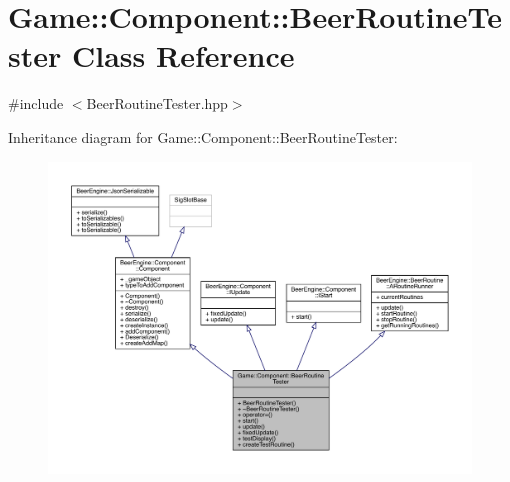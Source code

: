 \hypertarget{class_game_1_1_component_1_1_beer_routine_tester}{}\section{Game\+:\+:Component\+:\+:Beer\+Routine\+Tester Class Reference}
\label{class_game_1_1_component_1_1_beer_routine_tester}


{\ttfamily \#include $<$Beer\+Routine\+Tester.\+hpp$>$}



Inheritance diagram for Game\+:\+:Component\+:\+:Beer\+Routine\+Tester\+:\nopagebreak
\begin{figure}[H]
\begin{center}
\leavevmode
\includegraphics[width=350pt]{class_game_1_1_component_1_1_beer_routine_tester__inherit__graph}
\end{center}
\end{figure}


